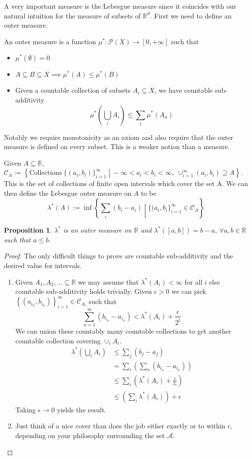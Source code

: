 \documentclass[11pt]{article}
\newcommand{\defeq}{:=}
\newcommand{\relmiddle}[1]{\mathrel{}\middle#1\mathrel{}}
\newcommand{\rmv}{\relmiddle|}
\newcommand{\pow}[1]{\mathcal{P}(#1)}
\newcommand{\R}{\mathbb{R}}
\newenvironment{defin}
	{\begin{mdframed}[backgroundcolor=white, roundcorner=5pt, linewidth=1pt]}
	{\end{mdframed}}
\newcommand{\mdf}[1]{{\color{red} #1}}
\newtheorem{prop}[theorem]{Proposition}
\begin{document}
A very important measure is the Lebesgue measure since it coincides with our natural intuition for the measure of subsets of $\R^d$.
First we need to define an outer measure.
\begin{defin}
	An \mdf{outer measure} is a function $\mu^*:\pow{X}\to[0,+\infty]$ such that
	\begin{itemize}
		\item $\mu^*(\emptyset)=0$
		\item $A\subseteq B\subseteq X\implies \mu^*(A)\leq\mu^*(B)$
		\item Given a countable collection of subsets $A_i\subseteq X$, we have countable sub-additivity 
			$$\mu^*\left(\bigcup_i A_i\right)\leq\sum_i \mu^*(A_u)$$
	\end{itemize}
	Notably we require monotonicity as an axiom and also require that the outer measure is defined on every subset.
	This is a weaker notion than a measure.

	Given $A\subseteq\R$, $\mathcal{C}_A\defeq\left\{\text{Collections}\;\{(a_i,b_i)\}_{i=1}^\infty \rmv -\infty < a_i < b_i < \infty, \; \cup_{i=1}^\infty (a_i,b_i)\supseteq A \right\}$.
	This is the set of collections of finite open intervals which cover the set A.
	We can then define the \mdf{Lebesgue outer measure} on $A$ to be
	$$\lambda^*(A)\defeq\inf\left\{\sum_i(b_i-a_i) \rmv \{(a_i,b_i\}_{i=1}^\infty\in\mathcal{C}_A\right\}$$
\end{defin}
\begin{prop}
	$\lambda^*$ is an outer measure on $\R$ and $\lambda^*([a,b])=b-a$, $\forall a, b\in\R$ such that $a\leq b$.
\end{prop}
\begin{proof}
The only difficult things to prove are countable sub-additivity and the desired value for intervals.
\begin{enumerate}[label=(\roman*)]
	\item Given $A_1,A_2, \dots\subseteq\R$ we may assume that $\lambda^*(A_i)<\infty$ for all $i$ else countable sub-additivity holds trivially.
		Given $\epsilon >0$ we can pick $\left\{(a_{i_n},b_{i_n})\right\}_{i=1}^\infty\in\mathcal{C}_{A_i}$ such that 
		$$\sum_{n=1}^\infty (b_{i_n}-a_{i_n})< \lambda^*(A_i)+\frac{\epsilon}{2^i}$$
		We can union these countably many countable collections to get another countable collection covering $\cup_i A_i$.
		\begin{align*}
			\lambda^*\left(\bigcup_i A_i\right)&\leq \sum_j(b_j-a_j)\\
											   &=\sum_i\left(\sum_n\left(b_{i_n}-a_{i_n}\right)\right)\\
											   &\leq\sum_i\left(\lambda^*(A_i)+\frac{\epsilon}{2_i}\right)\\
											   &\leq\left(\sum_i\lambda^*(A_i)\right)+\epsilon
		\end{align*}
		Taking $\epsilon\to 0$ yields the result.
	\item Just think of a nice cover than does the job either exactly or to within $\epsilon$, depending on your philosophy surrounding the set $\mathcal{A}$.
\end{enumerate}
\end{proof}
\end{document}
